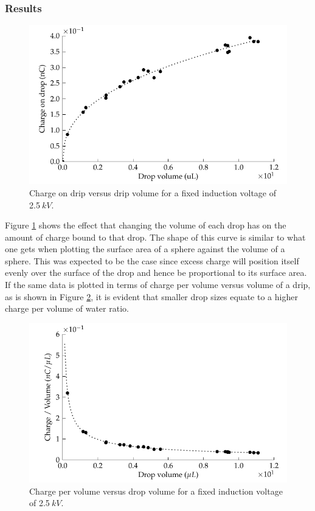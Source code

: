 \subsubsection*{Results}

\begin{figure}
    \centering
    \includegraphics{content/appendices/chargedWaterDrops/graphics/dripper_chargeVsVolume}
    \caption{\label{Graph_dripperExperiment_chargeVsVolume}Charge on drip versus
drip volume for a fixed induction voltage of 2.5$\: kV$.}
\end{figure}
Figure \ref{Graph_dripperExperiment_chargeVsVolume} shows the effect
that changing the volume of each drop has on the amount of charge
bound to that drop. The shape of this curve is similar to what one
gets when plotting the surface area of a sphere against the volume
of a sphere. This was expected to be the case since excess charge
will position itself evenly over the surface of the drop and hence
be proportional to its surface area. If the same data is plotted in
terms of charge per volume versus volume of a drip, as is shown in
Figure \ref{Figure_Graph_dripper_chargePerVolumeVsVolume}, it is
evident that smaller drop sizes equate to a higher charge per volume
of water ratio.

\begin{figure}
    \centering
    \includegraphics{content/appendices/chargedWaterDrops/graphics/dripper_chargePerVolumeVsVolume}
    \caption{\label{Figure_Graph_dripper_chargePerVolumeVsVolume}Charge per volume
    versus drop volume for a fixed induction voltage of 2.5$\: kV$.}
\end{figure}


